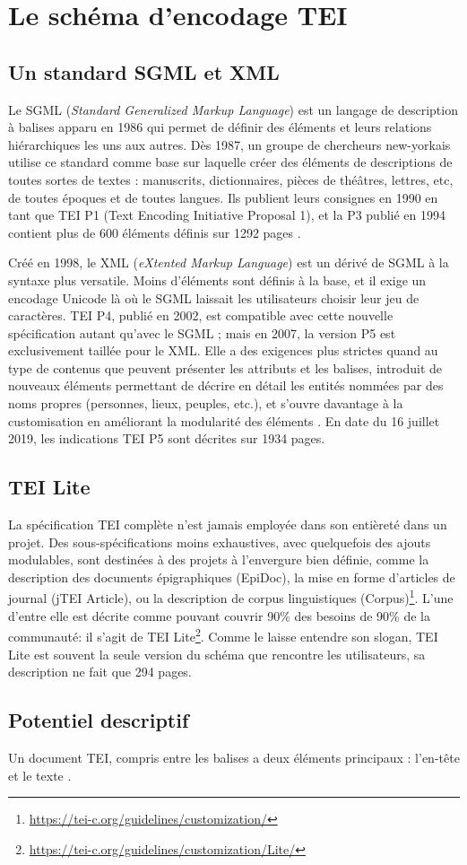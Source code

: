 \chapter{Le schéma d'encodage TEI}\label{TEI}
\section{Un standard SGML et XML}\label{TEIXML}
Le SGML (\emph{Standard Generalized Markup Language}) est un langage de description à balises apparu en 1986 qui permet de définir des éléments et leurs relations hiérarchiques les uns aux autres.
Dès 1987, un groupe de chercheurs new-yorkais utilise ce standard comme base sur laquelle créer des éléments de descriptions de toutes sortes de textes : manuscrits, dictionnaires, pièces de théâtres, lettres, etc, de toutes époques et de toutes langues.
Ils publient leurs consignes en 1990 en tant que TEI P1 (Text Encoding Initiative Proposal 1), et la P3 publié en 1994 contient plus de 600 éléments définis sur 1292 pages \parencite{vanhoutte_introduction_2004}.

Créé en 1998, le XML (\emph{eXtented Markup Language}) est un dérivé de SGML à la syntaxe plus versatile.
Moins d'éléments sont définis à la base, et il exige un encodage Unicode là où le SGML laissait les utilisateurs choisir leur jeu de caractères.
TEI P4, publié en 2002, est compatible avec cette nouvelle spécification autant qu'avec le SGML ; mais en 2007, la version P5 est exclusivement taillée pour le XML.
Elle a des exigences plus strictes quand au type de contenus que peuvent présenter les attributs et les balises, introduit de nouveaux éléments permettant de décrire en détail les entités nommées par des noms propres (personnes, lieux, peuples, etc.), et s'ouvre davantage à la customisation en améliorant la modularité des éléments \parencite{wittern_making_2009}.
En date du 16 juillet 2019, les indications TEI P5 sont décrites sur 1934 pages.
\section{TEI Lite}\label{TEILite}
La spécification TEI complète n'est jamais employée dans son entièreté dans un projet.
Des sous-spécifications moins exhaustives, avec quelquefois des ajouts modulables, sont destinées à des projets à l'envergure bien définie, comme la description des documents épigraphiques (EpiDoc), la mise en forme d'articles de journal (jTEI Article), ou la description de corpus linguistiques (Corpus)\footnote{\url{https://tei-c.org/guidelines/customization/}}.
L'une d'entre elle est décrite comme pouvant \og couvrir 90\% des besoins de 90\% de la communauté\fg : il s'agit de TEI Lite\footnote{\url{https://tei-c.org/guidelines/customization/Lite/}}.
Comme le laisse entendre son slogan, TEI Lite est souvent la seule version du schéma que rencontre les utilisateurs, sa description ne fait que 294 pages.
\section{Potentiel descriptif}\label{TEIPot}
Un document TEI, compris entre les balises  a deux éléments principaux : l'en-tête  et le texte .
